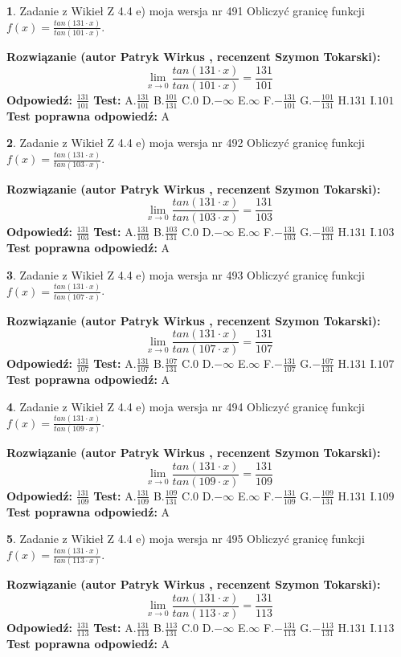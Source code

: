 \documentclass[12pt, a4paper]{article}
\theoremstyle{definition} %
\newtheorem{zad}{}
\newcommand{\zadStart}[1]{\begin{zad}#1\newline}
\newcommand{\zadStop}{\end{zad}}
\newcommand{\rozwStart}[2]{\noindent \textbf{Rozwiązanie (autor #1 , recenzent #2): }\newline}
\newcommand{\rozwStop}{\newline}
\newcommand{\odpStart}{\noindent \textbf{Odpowiedź:}\newline}
\newcommand{\odpStop}{\newline}
\newcommand{\testStart}{\noindent \textbf{Test:}\newline}
\newcommand{\testStop}{\newline}
\newcommand{\kluczStart}{\noindent \textbf{Test poprawna odpowiedź:}\newline}
\newcommand{\kluczStop}{\newline}
\begin{document}
\zadStart{Zadanie z Wikieł Z 4.4 e) moja wersja nr 491}
Obliczyć granicę funkcji $f(x)=\frac{tan(131\cdot x)}{tan(101\cdot x)}$.
\zadStop
\rozwStart{Patryk Wirkus}{Szymon Tokarski}
$$\lim\limits_{x\to 0}\frac{tan(131\cdot x)}{tan(101\cdot x)}=
\frac{131}{101}$$
\rozwStop
\odpStart
$\frac{131}{101}$
\odpStop
\testStart
A.$\frac{131}{101}$
B.$\frac{101}{131}$
C.$0$
D.$-\infty$
E.$\infty$
F.$-\frac{131}{101}$
G.$-\frac{101}{131}$
H.$131$
I.$101$
\testStop
\kluczStart
A
\kluczStop



\zadStart{Zadanie z Wikieł Z 4.4 e) moja wersja nr 492}
Obliczyć granicę funkcji $f(x)=\frac{tan(131\cdot x)}{tan(103\cdot x)}$.
\zadStop
\rozwStart{Patryk Wirkus}{Szymon Tokarski}
$$\lim\limits_{x\to 0}\frac{tan(131\cdot x)}{tan(103\cdot x)}=
\frac{131}{103}$$
\rozwStop
\odpStart
$\frac{131}{103}$
\odpStop
\testStart
A.$\frac{131}{103}$
B.$\frac{103}{131}$
C.$0$
D.$-\infty$
E.$\infty$
F.$-\frac{131}{103}$
G.$-\frac{103}{131}$
H.$131$
I.$103$
\testStop
\kluczStart
A
\kluczStop



\zadStart{Zadanie z Wikieł Z 4.4 e) moja wersja nr 493}
Obliczyć granicę funkcji $f(x)=\frac{tan(131\cdot x)}{tan(107\cdot x)}$.
\zadStop
\rozwStart{Patryk Wirkus}{Szymon Tokarski}
$$\lim\limits_{x\to 0}\frac{tan(131\cdot x)}{tan(107\cdot x)}=
\frac{131}{107}$$
\rozwStop
\odpStart
$\frac{131}{107}$
\odpStop
\testStart
A.$\frac{131}{107}$
B.$\frac{107}{131}$
C.$0$
D.$-\infty$
E.$\infty$
F.$-\frac{131}{107}$
G.$-\frac{107}{131}$
H.$131$
I.$107$
\testStop
\kluczStart
A
\kluczStop



\zadStart{Zadanie z Wikieł Z 4.4 e) moja wersja nr 494}
Obliczyć granicę funkcji $f(x)=\frac{tan(131\cdot x)}{tan(109\cdot x)}$.
\zadStop
\rozwStart{Patryk Wirkus}{Szymon Tokarski}
$$\lim\limits_{x\to 0}\frac{tan(131\cdot x)}{tan(109\cdot x)}=
\frac{131}{109}$$
\rozwStop
\odpStart
$\frac{131}{109}$
\odpStop
\testStart
A.$\frac{131}{109}$
B.$\frac{109}{131}$
C.$0$
D.$-\infty$
E.$\infty$
F.$-\frac{131}{109}$
G.$-\frac{109}{131}$
H.$131$
I.$109$
\testStop
\kluczStart
A
\kluczStop



\zadStart{Zadanie z Wikieł Z 4.4 e) moja wersja nr 495}
Obliczyć granicę funkcji $f(x)=\frac{tan(131\cdot x)}{tan(113\cdot x)}$.
\zadStop
\rozwStart{Patryk Wirkus}{Szymon Tokarski}
$$\lim\limits_{x\to 0}\frac{tan(131\cdot x)}{tan(113\cdot x)}=
\frac{131}{113}$$
\rozwStop
\odpStart
$\frac{131}{113}$
\odpStop
\testStart
A.$\frac{131}{113}$
B.$\frac{113}{131}$
C.$0$
D.$-\infty$
E.$\infty$
F.$-\frac{131}{113}$
G.$-\frac{113}{131}$
H.$131$
I.$113$
\testStop
\kluczStart
A
\kluczStop
\end{document}
